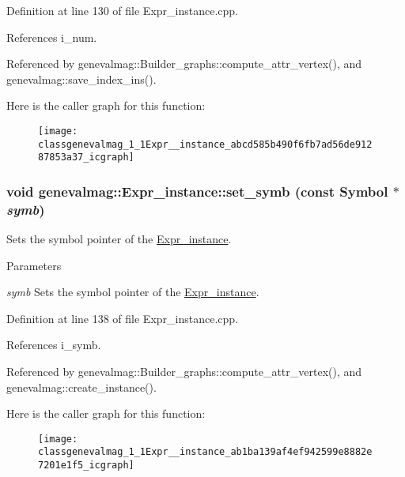 Definition at line 130 of file Expr\_\-instance.cpp.



References i\_\-num.



Referenced by genevalmag::Builder\_\-graphs::compute\_\-attr\_\-vertex(), and genevalmag::save\_\-index\_\-ins().



Here is the caller graph for this function:\nopagebreak
\begin{figure}[H]
\begin{center}
\leavevmode
\texttt{[image: classgenevalmag\_1\_1Expr\_\_instance\_abcd585b490f6fb7ad56de91287853a37\_icgraph]}
\end{center}
\end{figure}


\hypertarget{classgenevalmag_1_1Expr__instance_ab1ba139af4ef942599e8882e7201e1f5}{
\subsubsection[{set\_\-symb}]{\setlength{\rightskip}{0pt plus 5cm}void genevalmag::Expr\_\-instance::set\_\-symb (const {\bf Symbol} $\ast$ {\em symb})}}
\label{classgenevalmag_1_1Expr__instance_ab1ba139af4ef942599e8882e7201e1f5}
Sets the symbol pointer of the \hyperlink{classgenevalmag_1_1Expr__instance}{Expr\_\-instance}. 
\begin{DoxyParams}{Parameters}
\item[{\em symb}]Sets the symbol pointer of the \hyperlink{classgenevalmag_1_1Expr__instance}{Expr\_\-instance}. \end{DoxyParams}


Definition at line 138 of file Expr\_\-instance.cpp.



References i\_\-symb.



Referenced by genevalmag::Builder\_\-graphs::compute\_\-attr\_\-vertex(), and genevalmag::create\_\-instance().



Here is the caller graph for this function:\nopagebreak
\begin{figure}[H]
\begin{center}
\leavevmode
\texttt{[image: classgenevalmag\_1\_1Expr\_\_instance\_ab1ba139af4ef942599e8882e7201e1f5\_icgraph]}
\end{center}
\end{figure}


